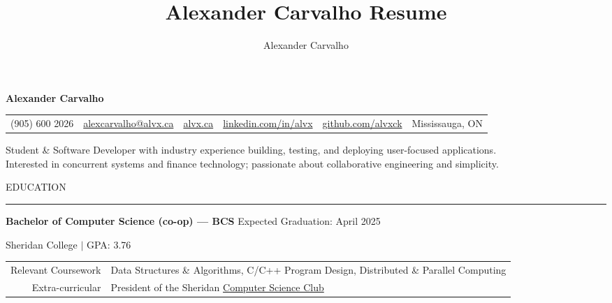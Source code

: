 \documentclass[9pt]{extarticle}
\title{Alexander Carvalho Resume}
\author{Alexander Carvalho}
\begin{document}
\color{regtextgray}


\begin{center}
	\textcolor{imptextblack}{\textbf{\fontsize{19}{0}\selectfont Alexander Carvalho}}

	\vspace{5pt}	

	\begin{tabular}{ c c c c c c }
		\textcolor{imptextblack}{(905) 600 2026} & 
		\href{mailto:alexcarvalho@alvx.ca}{alexcarvalho@alvx.ca} & 
		\href{https://alvx.ca}{alvx.ca} & 
		\href{https://www.linkedin.com/in/alvx}{linkedin.com/in/alvx} & 
		\href{https://www.github.com/alvxck}{github.com/alvxck} & 
		\textcolor{imptextblack}{Mississauga, ON}
	\end{tabular}

	\vspace{5pt}	

	Student \& Software Developer with industry experience building, testing, and deploying user-focused applications.  \\
	Interested in concurrent systems and finance technology; passionate about collaborative engineering and simplicity.
\end{center}


\begin{adjustwidth}{4pt}{4pt} \large \textrm{EDUCATION} \end{adjustwidth}
\rule[8pt]{\linewidth}{0.4pt}

\begin{adjustwidth}{10pt}{10pt}
	\vspace{-5pt}	

	\textcolor{imptextblack}{\textbf{\large Bachelor of Computer Science (co-op) — BCS}} \hfill Expected Graduation: April 2025
	
	Sheridan College $|$ {\small GPA: 3.76}
	
	\begin{adjustwidth}{18pt}{18pt}
		\begin{tabular}{ r l }
		 	\textcolor{imptextblack}{Relevant Coursework} & Data Structures \& Algorithms, C/C++ Program Design, Distributed \& Parallel Computing \\ 
			\textcolor{imptextblack}{Extra-curricular} & President of the Sheridan \href{https://sheridancollege.campuslabs.ca/engage/organization/mobilecomputingclub}{Computer Science Club} \\
		\end{tabular}
	\end{adjustwidth}
\end{adjustwidth}
\end{document}
